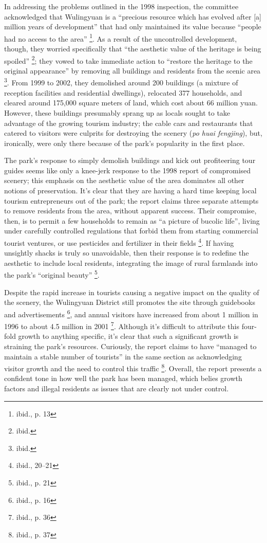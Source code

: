 In addressing the problems outlined in the 1998 inspection, the committee
acknowledged that Wulingyuan is a ``precious resource which has evolved after
[a] million years of development'' that had only
maintained its value because ``people had no access to the area''
\footnote{ibid., p. 13}. As a result of the uncontrolled development, though,
they worried specifically that ``the aesthetic value of the heritage is being
spoiled'' \footnote{ibid.}; they vowed to take immediate action to ``restore
the heritage to the original appearance'' by removing all buildings and
residents from the scenic area \footnote{ibid.}. From 1999 to 2002, they
demolished around 200 buildings (a mixture of reception facilities and
residential dwellings), relocated 377 households, and cleared around 175,000
square meters of land, which cost about 66 million yuan. However, these
buildings presumably sprang up as locals sought to take advantage of the
growing tourism industry; the cable cars and restaurants that catered to
visitors were culprits for destroying the scenery (\textit{po huai fengjing}),
but, ironically, were only there because of the park's popularity in the first
place.

The park's response to simply demolish buildings and kick out profiteering tour
guides seems like only a knee-jerk response to the 1998 report of compromised
scenery; this emphasis on the aesthetic value of the area dominates all other
notions of preservation. It's clear that they are having a hard time keeping local tourism entrepreneurs out of the
park; the report claims three separate attempts to remove residents from the
area, without apparent success. Their compromise, then, is to permit a few
households to remain as ``a picture of bucolic life'', living under carefully
controlled regulations that forbid them from starting commercial tourist
ventures, or use pesticides and fertilizer in their fields \footnote{ibid.,
20--21}. If having unsightly shacks is truly so unavoidable, then their
response is to
redefine the aesthetic to include local residents, integrating the image of
rural farmlands into the park's ``original beauty'' \footnote{ibid., p. 21}.

Despite the rapid increase in tourists causing a negative impact on the quality of the scenery,
the Wulingyuan District still promotes the site through guidebooks and
advertisements \footnote{ibid., p. 16}, and annual visitors have increased from
about 1 million in 1996 to  about 4.5 million in 2001 \footnote{ibid., p. 36}.
Although it's difficult to attribute this four-fold growth to anything
specific, it's clear that such a significant growth is straining the park's
resources. Curiously, the report claims to have ``managed to maintain a stable
number of tourists'' in the same section as acknowledging visitor growth and
the need to control this traffic \footnote{ibid., p. 37}. Overall, the report
presents a confident tone in how well the park has been managed, which belies
growth factors and illegal residents as issues that are clearly not under
control.

